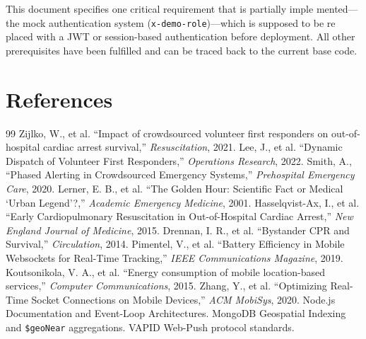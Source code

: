\documentclass[12pt,a4paper]{article}
\begin{document}
This document specifies one critical requirement that is partially imple mented—the mock authentication system (\texttt{x-demo-role})—which is supposed to be re placed with a JWT or session-based authentication before deployment. All other prerequisites have been fulfilled and can be traced back to the current base code.

\section{References}
\begin{thebibliography}{99}
   Zijlko, W., et al. ``Impact of crowdsourced volunteer first responders on out-of-hospital cardiac arrest survival,'' \textit{Resuscitation}, 2021.
   Lee, J., et al. ``Dynamic Dispatch of Volunteer First Responders,'' \textit{Operations Research}, 2022.
   Smith, A., ``Phased Alerting in Crowdsourced Emergency Systems,'' \textit{Prehospital Emergency Care}, 2020.
   Lerner, E. B., et al. ``The Golden Hour: Scientific Fact or Medical `Urban Legend'?,'' \textit{Academic Emergency Medicine}, 2001.
   Hasselqvist-Ax, I., et al. ``Early Cardiopulmonary Resuscitation in Out-of-Hospital Cardiac Arrest,'' \textit{New England Journal of Medicine}, 2015.
   Drennan, I. R., et al. ``Bystander CPR and Survival,'' \textit{Circulation}, 2014.
   Pimentel, V., et al. ``Battery Efficiency in Mobile Websockets for Real-Time Tracking,'' \textit{IEEE Communications Magazine}, 2019.
   Koutsonikola, V. A., et al. ``Energy consumption of mobile location-based services,'' \textit{Computer Communications}, 2015.
   Zhang, Y., et al. ``Optimizing Real-Time Socket Connections on Mobile Devices,'' \textit{ACM MobiSys}, 2020.
   Node.js Documentation and Event-Loop Architectures.
   MongoDB Geospatial Indexing and \texttt{\$geoNear} aggregations.
   VAPID Web-Push protocol standards.
\end{thebibliography}
\end{document}
